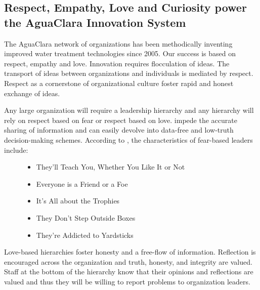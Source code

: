\documentclass[letterpaper,10pt,english]{sphinxmanual}
\begin{document}
\subsection{Respect, Empathy, Love and Curiosity power the AguaClara Innovation System}
\label{\detokenize{Introduction/Introduction:respect-empathy-love-and-curiosity-power-the-aguaclara-innovation-system}}\label{\detokenize{Introduction/Introduction:heading-empathy}}
The AguaClara network of organizations has been methodically inventing improved water treatment technologies since 2005. Our success is based on respect, empathy and love. Innovation requires flocculation of ideas. The transport of ideas between organizations and individuals is mediated by respect. Respect as a cornerstone of organizational culture foster rapid and honest exchange of ideas.
\begin{description}
\item[{Any large organization will require a leadership hierarchy and any hierarchy will rely on respect based on fear or respect based on love.  impede the accurate sharing of information and can easily devolve into data-free and low-truth decision-making schemes. According to , the characteristics of fear-based leaders include:}] \leavevmode\begin{itemize}
\item {} 
They’ll Teach You, Whether You Like It or Not

\item {} 
Everyone is a Friend or a Foe

\item {} 
It’s All about the Trophies

\item {} 
They Don’t Step Outside Boxes

\item {} 
They’re Addicted to Yardsticks

\end{itemize}

\end{description}

Love-based hierarchies foster honesty and a free-flow of information. Reflection is encouraged across the organization and truth, honesty, and integrity are valued. Staff at the bottom of the hierarchy know that their opinions and reflections are valued and thus they will be willing to report problems to organization leaders.
\end{document}
